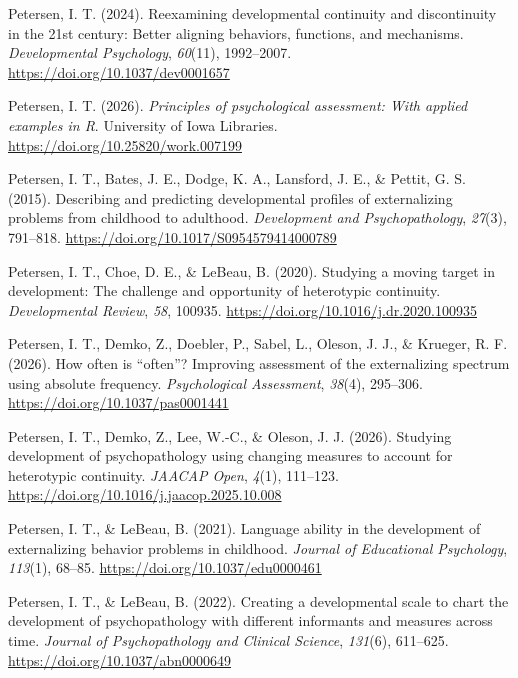 \documentclass[
  american,
  letterpaper,
  12pt]{article}
\newlength{\cslhangindent}
\newenvironment{CSLReferences}[2] %
 {\begin{list}{}{%
  \setlength{\itemindent}{0pt}
  \setlength{\leftmargin}{0pt}
  \setlength{\parsep}{0pt}
  \ifodd #1
   \setlength{\leftmargin}{\cslhangindent}
   \setlength{\itemindent}{-1\cslhangindent}
  \fi
  \setlength{\itemsep}{#2\baselineskip}}}
 {\end{list}}
\begin{document}
\begin{CSLReferences}{1}{0}
Petersen, I. T. (2024). Reexamining developmental continuity and
discontinuity in the 21st century: {Better} aligning behaviors,
functions, and mechanisms. \emph{Developmental Psychology},
\emph{60}(11), 1992--2007. \url{https://doi.org/10.1037/dev0001657}

Petersen, I. T. (2026). \emph{Principles of psychological assessment:
{With} applied examples in {R}}. University of Iowa Libraries.
\url{https://doi.org/10.25820/work.007199}

Petersen, I. T., Bates, J. E., Dodge, K. A., Lansford, J. E., \& Pettit,
G. S. (2015). Describing and predicting developmental profiles of
externalizing problems from childhood to adulthood. \emph{Development
and Psychopathology}, \emph{27}(3), 791--818.
\url{https://doi.org/10.1017/S0954579414000789}

Petersen, I. T., Choe, D. E., \& LeBeau, B. (2020). Studying a moving
target in development: {The} challenge and opportunity of heterotypic
continuity. \emph{Developmental Review}, \emph{58}, 100935.
\url{https://doi.org/10.1016/j.dr.2020.100935}

Petersen, I. T., Demko, Z., Doebler, P., Sabel, L., Oleson, J. J., \&
Krueger, R. F. (2026). How often is {``often''}? {Improving} assessment
of the externalizing spectrum using absolute frequency.
\emph{Psychological Assessment}, \emph{38}(4), 295--306.
\url{https://doi.org/10.1037/pas0001441}

Petersen, I. T., Demko, Z., Lee, W.-C., \& Oleson, J. J. (2026).
Studying development of psychopathology using changing measures to
account for heterotypic continuity. \emph{JAACAP Open}, \emph{4}(1),
111--123. \url{https://doi.org/10.1016/j.jaacop.2025.10.008}

Petersen, I. T., \& LeBeau, B. (2021). Language ability in the
development of externalizing behavior problems in childhood.
\emph{Journal of Educational Psychology}, \emph{113}(1), 68--85.
\url{https://doi.org/10.1037/edu0000461}

Petersen, I. T., \& LeBeau, B. (2022). Creating a developmental scale to
chart the development of psychopathology with different informants and
measures across time. \emph{Journal of Psychopathology and Clinical
Science}, \emph{131}(6), 611--625.
\url{https://doi.org/10.1037/abn0000649}


\end{CSLReferences}
\end{document}
